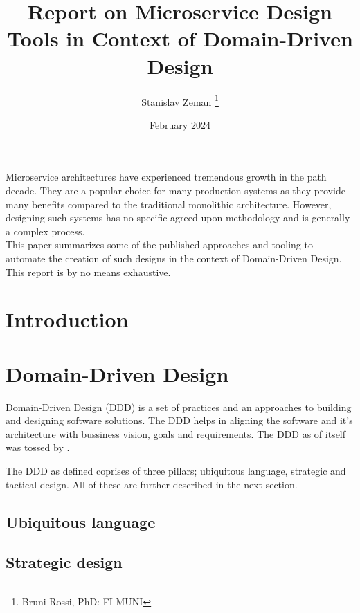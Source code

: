 \documentclass[letterpaper,12pt,leqno]{article}
\begin{document}
\title{Report on Microservice Design Tools in Context of Domain-Driven Design}
\author{Stanislav Zeman \thanks{Bruni Rossi, PhD: FI MUNI}}
\date{February 2024}

\begin{titlepage}
\maketitle

Microservice architectures have experienced tremendous growth in the path decade. They are a popular choice for many production systems as they provide many benefits compared to the traditional monolithic architecture. However, designing such systems has no specific agreed-upon methodology and is generally a complex process. \\

This paper summarizes some of the published approaches and tooling to automate the creation of such designs in the context of Domain-Driven Design. This report is by no means exhaustive.

\end{titlepage}

\tableofcontents

\section{Introduction}\label{s:introduction}

\section{Domain-Driven Design}\label{s:ddd}

Domain-Driven Design (DDD) is a set of practices and an approaches to building and designing software solutions. The DDD helps in aligning the software and it's architecture with bussiness vision, goals and requirements. The DDD as of itself was tossed by \cite{evans2004ddd}.

The DDD as defined coprises of three pillars; ubiquitous language, strategic and tactical design. All of these are further described in the next section.

\subsection{Ubiquitous language}
\subsection{Strategic design}
\end{document}
